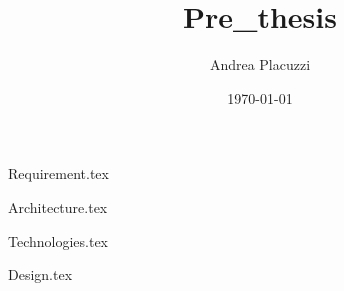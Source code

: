 \documentclass[12pt, english]{report}
\title{Pre\_thesis}
\author{Andrea Placuzzi \\ \emailaddr{andrea.placuzzi@studio.unibo.it}}
\date{\today}
\begin{document}
\sloppy
\maketitle

\tableofcontents

{Requirement.tex}


{Architecture.tex}


{Technologies.tex}


{Design.tex}


\end{document}
